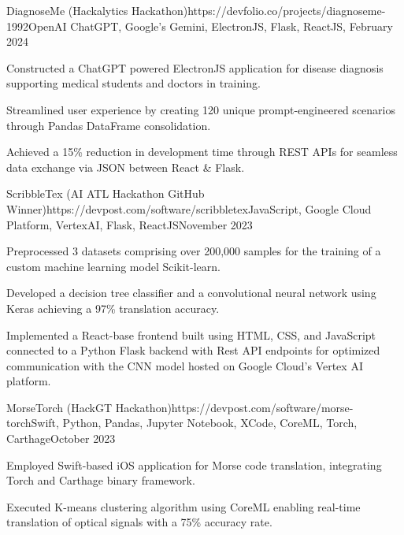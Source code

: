 \documentclass{article}
\begin{document}
\begin{flushleft}
    \begin{project}{DiagnoseMe (Hackalytics Hackathon)}{https://devfolio.co/projects/diagnoseme-1992}{OpenAI ChatGPT, Google's Gemini, ElectronJS, Flask, ReactJS, }{February 2024}
        \item Constructed a ChatGPT powered ElectronJS application for disease diagnosis supporting medical students and doctors in training.
        \item Streamlined user experience by creating 120 unique prompt-engineered scenarios through Pandas DataFrame consolidation.
        \item Achieved a 15\% reduction in development time through REST APIs for seamless data exchange via JSON between React \& Flask.
    \end{project}

    \begin{project}{ScribbleTex (AI ATL Hackathon GitHub Winner)}{https://devpost.com/software/scribbletex}{JavaScript, Google Cloud Platform, VertexAI, Flask, ReactJS}{November 2023}
        \item Preprocessed 3 datasets comprising over 200,000 samples for the training of a custom machine learning model Scikit-learn.
        \item Developed a decision tree classifier and a convolutional neural network using Keras achieving a 97\% translation accuracy.
        \item Implemented a React-base frontend built using HTML, CSS, and JavaScript connected to a Python Flask backend with Rest API endpoints for optimized communication with the CNN model hosted on Google Cloud's Vertex AI platform.
    \end{project}

    \begin{project}{MorseTorch (HackGT Hackathon)}{https://devpost.com/software/morse-torch}{Swift, Python, Pandas, Jupyter Notebook, XCode, CoreML, Torch, Carthage}{October 2023}
        \item Employed Swift-based iOS application for Morse code translation, integrating Torch and Carthage binary framework.
        \item Executed K-means clustering algorithm using CoreML enabling real-time translation of optical signals with a 75\% accuracy rate.
        
    \end{project}



\end{flushleft}
\end{document}
